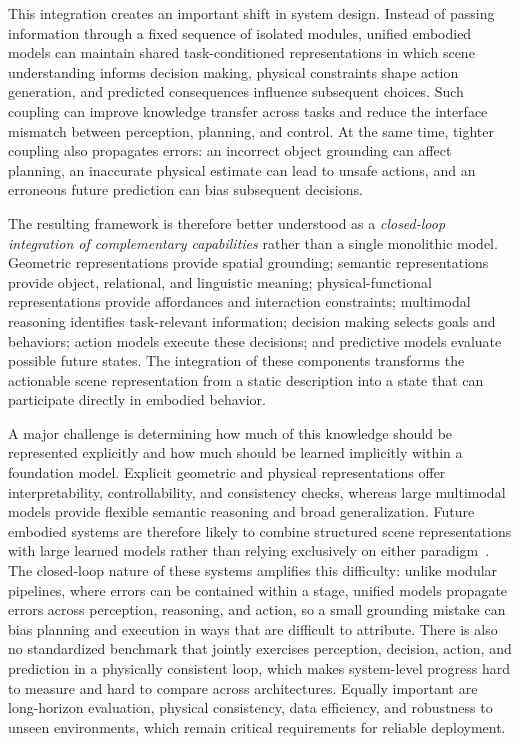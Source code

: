 \documentclass{SCIS2026}
\begin{document}
This integration creates an important shift in system design. Instead of passing information through a fixed sequence of isolated modules, unified embodied models can maintain shared task-conditioned representations in which scene understanding informs decision making, physical constraints shape action generation, and predicted consequences influence subsequent choices. Such coupling can improve knowledge transfer across tasks and reduce the interface mismatch between perception, planning, and control. At the same time, tighter coupling also propagates errors: an incorrect object grounding can affect planning, an inaccurate physical estimate can lead to unsafe actions, and an erroneous future prediction can bias subsequent decisions.

The resulting framework is therefore better understood as a \emph{closed-loop integration of complementary capabilities} rather than a single monolithic model. Geometric representations provide spatial grounding; semantic representations provide object, relational, and linguistic meaning; physical-functional representations provide affordances and interaction constraints; multimodal reasoning identifies task-relevant information; decision making selects goals and behaviors; action models execute these decisions; and predictive models evaluate possible future states. The integration of these components transforms the actionable scene representation from a static description into a state that can participate directly in embodied behavior.

A major challenge is determining how much of this knowledge should be represented explicitly and how much should be learned implicitly within a foundation model. Explicit geometric and physical representations offer interpretability, controllability, and consistency checks, whereas large multimodal models provide flexible semantic reasoning and broad generalization. Future embodied systems are therefore likely to combine structured scene representations with large learned models rather than relying exclusively on either paradigm~\cite{driess2023palme}. The closed-loop nature of these systems amplifies this difficulty: unlike modular pipelines, where errors can be contained within a stage, unified models propagate errors across perception, reasoning, and action, so a small grounding mistake can bias planning and execution in ways that are difficult to attribute. There is also no standardized benchmark that jointly exercises perception, decision, action, and prediction in a physically consistent loop, which makes system-level progress hard to measure and hard to compare across architectures. Equally important are long-horizon evaluation, physical consistency, data efficiency, and robustness to unseen environments, which remain critical requirements for reliable deployment.
\end{document}
